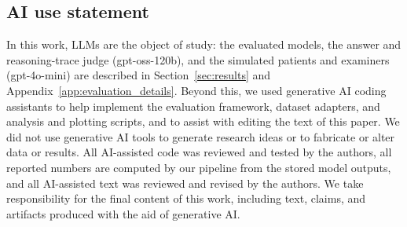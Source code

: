 

\subsection*{AI use statement}

In this work, LLMs are the object of study: the evaluated models, the answer and reasoning-trace judge (gpt-oss-120b), and the simulated patients and examiners (gpt-4o-mini) are described in Section~\ref{sec:results} and Appendix~\ref{app:evaluation_details}. Beyond this, we used generative AI coding assistants to help implement the evaluation framework, dataset adapters, and analysis and plotting scripts, and to assist with editing the text of this paper. We did not use generative AI tools to generate research ideas or to fabricate or alter data or results. All AI-assisted code was reviewed and tested by the authors, all reported numbers are computed by our pipeline from the stored model outputs, and all AI-assisted text was reviewed and revised by the authors. We take responsibility for the final content of this work, including text, claims, and artifacts produced with the aid of generative AI.




